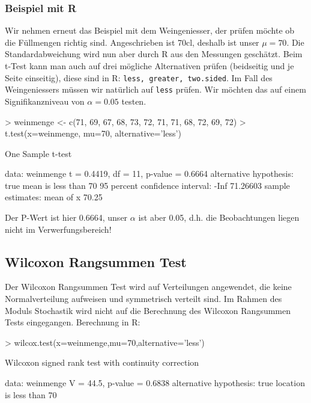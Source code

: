 \subsubsection{Beispiel mit R}
Wir nehmen erneut das Beispiel mit dem Weingeniesser, der prüfen möchte ob die 
Füllmengen richtig sind. Angeschrieben ist 70cl, deshalb ist unser $\mu=70$. 
Die Standardabweichung wird nun aber durch R aus den Messungen geschätzt. 
Beim t-Test kann man auch auf drei mögliche Alternativen prüfen 
(beidseitig und je Seite einseitig), diese sind in R: 
\verb!less, greater, two.sided!. Im Fall des Weingeniessers müssen wir 
natürlich auf \verb!less! prüfen. Wir möchten das auf einem Signifikanzniveau 
von $\alpha=0.05$ testen.
\begin{Schunk}
\begin{Sinput}
> weinmenge <- c(71, 69, 67, 68, 73, 72, 71, 71, 68, 72, 69, 72)
> t.test(x=weinmenge, mu=70, alternative='less')
\end{Sinput}
\begin{Soutput}
	One Sample t-test

data:  weinmenge 
t = 0.4419, df = 11, p-value = 0.6664
alternative hypothesis: true mean is less than 70 
95 percent confidence interval:
     -Inf 71.26603 
sample estimates:
mean of x 
    70.25 
\end{Soutput}
\end{Schunk}

\noindent
Der P-Wert ist hier 0.6664, unser $\alpha$ ist aber 0.05, d.h. 
die Beobachtungen liegen nicht im Verwerfungsbereich!


\subsection{Wilcoxon Rangsummen Test}
Der Wilcoxon Rangsummen Test wird auf Verteilungen angewendet, die keine 
Normalverteilung aufweisen und symmetrisch verteilt sind. Im Rahmen des Moduls 
Stochastik wird nicht auf die Berechnung des Wilcoxon Rangsummen Tests 
eingegangen. Berechnung in R: 
\begin{Schunk}
\begin{Sinput}
> wilcox.test(x=weinmenge,mu=70,alternative='less')
\end{Sinput}
\begin{Soutput}
	Wilcoxon signed rank test with continuity correction

data:  weinmenge 
V = 44.5, p-value = 0.6838
alternative hypothesis: true location is less than 70 
\end{Soutput}
\end{Schunk}

